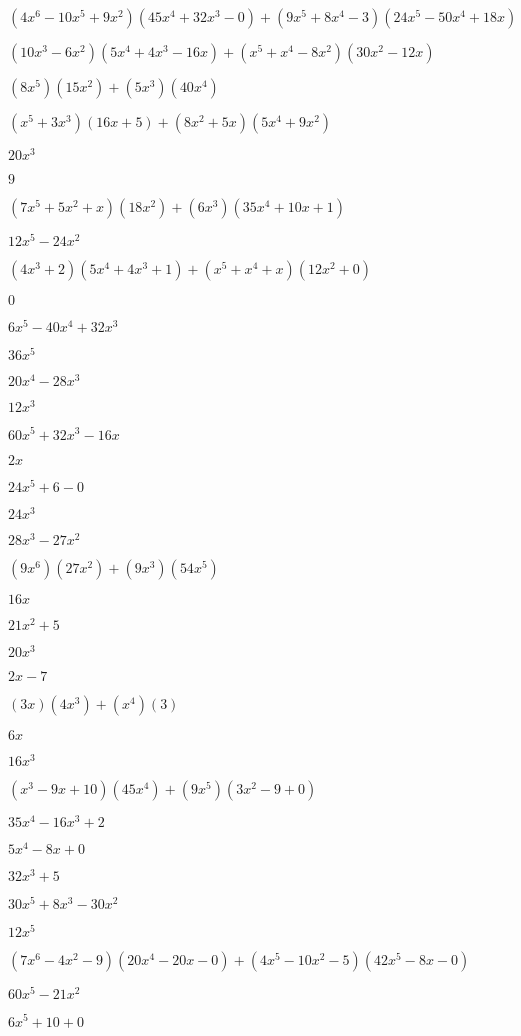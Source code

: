 \documentclass{article}
\begin{document}
\begin{multicols}{2}
$(4x^{6}-10x^{5}+9x^2)(45x^{4}+32x^{3}-0)+(9x^{5}+8x^{4}-3)(24x^{5}-50x^{4}+18x)$\item $(10x^{3}-6x^2)(5x^{4}+4x^{3}-16x)+(x^{5}+x^{4}-8x^2)(30x^{2}-12x)$\item $(8x^{5})(15x^{2})+(5x^{3})(40x^{4})$\item $(x^{5}+3x^{3})(16x+5)+(8x^2+5x)(5x^{4}+9x^{2})$\item $20x^{3}$\item $9$\item $(7x^{5}+5x^2+x)(18x^{2})+(6x^{3})(35x^{4}+10x+1)$\item $12x^{5}-24x^{2}$\item $(4x^{3}+2)(5x^{4}+4x^{3}+1)+(x^{5}+x^{4}+x)(12x^{2}+0)$\item $0$\item $6x^{5}-40x^{4}+32x^{3}$\item $36x^{5}$\item $20x^{4}-28x^{3}$\item $12x^{3}$\item $60x^{5}+32x^{3}-16x$\item $2x$\item $24x^{5}+6-0$\item $24x^{3}$\item $28x^{3}-27x^{2}$\item $(9x^{6})(27x^{2})+(9x^{3})(54x^{5})$\item $16x$\item $21x^{2}+5$\item $20x^{3}$\item $2x-7$\item $(3x)(4x^{3})+(x^{4})(3)$\item $6x$\item $16x^{3}$\item $(x^{3}-9x+10)(45x^{4})+(9x^{5})(3x^{2}-9+0)$\item $35x^{4}-16x^{3}+2$\item $5x^{4}-8x+0$\item $32x^{3}+5$\item $30x^{5}+8x^{3}-30x^{2}$\item $12x^{5}$\item $(7x^{6}-4x^2-9)(20x^{4}-20x-0)+(4x^{5}-10x^2-5)(42x^{5}-8x-0)$\item $60x^{5}-21x^{2}$\item $6x^{5}+10+0$\item 
\end{multicols}
\end{document}
